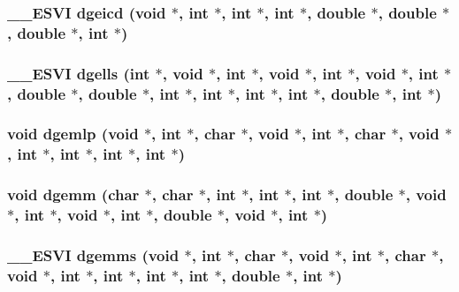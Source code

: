 \subsubsection{\setlength{\rightskip}{0pt plus 5cm}\_\-\_\-ESVI dgeicd (void $\ast$, int $\ast$, int $\ast$, int $\ast$, double $\ast$, double $\ast$, double $\ast$, int $\ast$)}\label{essl_8h_627c8864a0adcc81c93ee25af1e0d7f8}


\subsubsection{\setlength{\rightskip}{0pt plus 5cm}\_\-\_\-ESVI dgells (int $\ast$, void $\ast$, int $\ast$, void $\ast$, int $\ast$, void $\ast$, int $\ast$, double $\ast$, double $\ast$, int $\ast$, int $\ast$, int $\ast$, int $\ast$, double $\ast$, int $\ast$)}\label{essl_8h_69908cc17fad09fba2f154fc9bdce7f0}


\subsubsection{\setlength{\rightskip}{0pt plus 5cm}void dgemlp (void $\ast$, int $\ast$, char $\ast$, void $\ast$, int $\ast$, char $\ast$, void $\ast$, int $\ast$, int $\ast$, int $\ast$, int $\ast$)}\label{essl_8h_8ab9fdfca10d748512448ee302d08fa0}


\subsubsection{\setlength{\rightskip}{0pt plus 5cm}void dgemm (char $\ast$, char $\ast$, int $\ast$, int $\ast$, int $\ast$, double $\ast$, void $\ast$, int $\ast$, void $\ast$, int $\ast$, double $\ast$, void $\ast$, int $\ast$)}\label{essl_8h_c31bcedf2f2deb97a4e2d3c73cafb558}


\subsubsection{\setlength{\rightskip}{0pt plus 5cm}\_\-\_\-ESVI dgemms (void $\ast$, int $\ast$, char $\ast$, void $\ast$, int $\ast$, char $\ast$, void $\ast$, int $\ast$, int $\ast$, int $\ast$, int $\ast$, double $\ast$, int $\ast$)}\label{essl_8h_31a71d7cae061f89e20b60dd51967e56}


